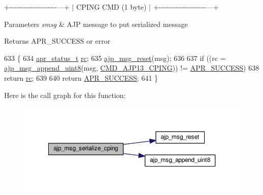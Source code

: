 +-\/-\/-\/-\/-\/-\/-\/-\/-\/-\/-\/-\/-\/-\/-\/-\/-\/-\/-\/-\/---+ $\vert$ C\+P\+I\+NG C\+MD (1 byte) $\vert$ +-\/-\/-\/-\/-\/-\/-\/-\/-\/-\/-\/-\/-\/-\/-\/-\/-\/-\/-\/-\/---+


\begin{DoxyParams}{Parameters}
{\em smsg} & A\+JP message to put serialized message \\
\hline
\end{DoxyParams}
\begin{DoxyReturn}{Returns}
A\+P\+R\+\_\+\+S\+U\+C\+C\+E\+SS or error 
\end{DoxyReturn}

\begin{DoxyCode}
633 \{
634     \hyperlink{group__apr__errno_gaa5105fa83cc322f09382292db8b47593}{apr\_status\_t} \hyperlink{group__APACHE__CORE__CONFIG_ga2e051c0ce9ee165170cd7973f2464512}{rc};
635     \hyperlink{group__AJP__api_gac85c7fdc0995b29207d13c7ea35b3f1e}{ajp\_msg\_reset}(msg);
636 
637     \textcolor{keywordflow}{if} ((rc = \hyperlink{group__AJP__api_ga3afb22b56fa344c93861e6090b044568}{ajp\_msg\_append\_uint8}(msg, \hyperlink{group__AJP__defines_ga5275597c9b9ef1043095028ea6fdd211}{CMD\_AJP13\_CPING})) != 
      \hyperlink{group__apr__errno_ga9ee311b7bf1c691dc521d721339ee2a6}{APR\_SUCCESS})
638         \textcolor{keywordflow}{return} \hyperlink{group__APACHE__CORE__CONFIG_ga2e051c0ce9ee165170cd7973f2464512}{rc};
639 
640     \textcolor{keywordflow}{return} \hyperlink{group__apr__errno_ga9ee311b7bf1c691dc521d721339ee2a6}{APR\_SUCCESS};
641 \}
\end{DoxyCode}


Here is the call graph for this function\+:
\nopagebreak
\begin{figure}[H]
\begin{center}
\leavevmode
\includegraphics[width=350pt]{group__AJP__api_ga995fdd0b8e81c9f99535c7d1c03feec9_cgraph}
\end{center}
\end{figure}





